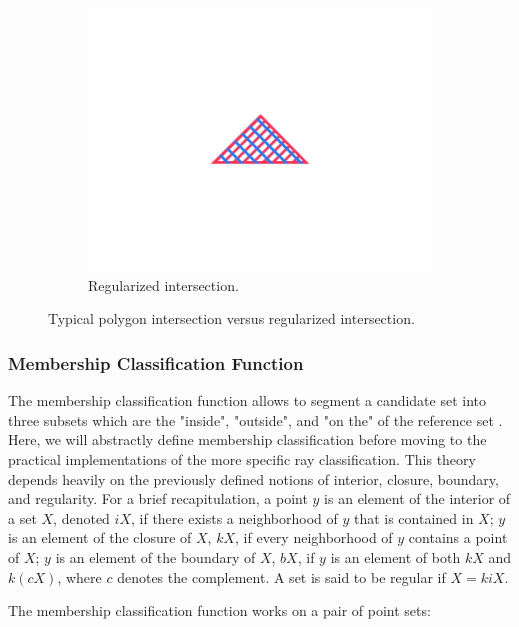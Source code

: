 \documentclass[a4paper,11pt,oneside]{article}
\begin{document}
\begin{figure}[ht]
\begin{subfigure}[b]{0.3\textwidth}
		\centering
		\includegraphics[width=\textwidth]{section3/3.2/regularization-regular.png}
		\caption{Regularized intersection.}
		\label{sec3.2:regular-intersection}
	\end{subfigure}
	\caption{Typical polygon intersection versus regularized intersection.}
	\label{sec3.2:regularity}
\end{figure}
   
\subsubsection{Membership Classification Function}
The membership classification function allows to segment a candidate set into three subsets which are the "inside", "outside", and "on the" of the reference set \cite{tilove1977a}. Here, we will abstractly define membership classification before moving to the practical implementations of the more specific ray classification.
This theory depends heavily on the previously defined notions of interior, closure, boundary, and regularity. For a brief recapitulation, a point $y$ is an element of the interior of a set $X$, denoted $iX$, if there exists a neighborhood of $y$ that is contained in $X$; $y$ is an element of the closure of $X$, $kX$, if every neighborhood of $y$ contains a point of $X$; $y$ is an element of the boundary of $X$, $bX$, if $y$ is an element of both $kX$ and $k(cX)$, where $c$ denotes the complement. A set is said to be regular if $X = kiX$.

The membership classification function works on a pair of point sets:
\end{document}
